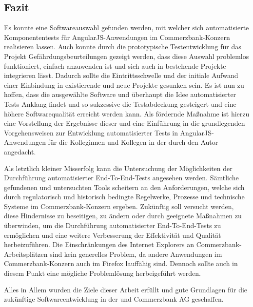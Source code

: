\subsection{Fazit}
Es konnte eine Softwareauswahl gefunden werden, mit welcher sich automatisierte Komponententests für AngularJS-Anwendungen im Commerzbank-Konzern realisieren lassen. Auch konnte durch die prototypische Testentwicklung für das Projekt Gefährdungsbeurteilungen gezeigt werden, dass diese Auswahl problemlos funktioniert, einfach anzuwenden ist und sich auch in bestehende Projekte integrieren lässt. Dadurch sollte die Eintrittsschwelle und der initiale Aufwand einer Einbindung in existierende und neue Projekte gesunken sein. Es ist nun zu hoffen, dass die ausgewählte Software und überhaupt die Idee automatisierter Tests Anklang findet und so sukzessive die Testabdeckung gesteigert und eine höhere Softwarequalität erreicht werden kann. Als fördernde Maßnahme ist hierzu eine Vorstellung der Ergebnisse dieser \titleDocument{} und eine Einführung in die grundlegenden Vorgehensweisen zur Entwicklung automatisierter Tests in AngularJS-Anwendungen für die Kolleginnen und Kollegen in der \domain{} durch den Autor angedacht.

Als letztlich kleiner Misserfolg kann die Untersuchung der Möglichkeiten der Durchführung automatisierter End-To-End-Tests angesehen werden. Sämtliche gefundenen und untersuchten Tools scheitern an den Anforderungen, welche sich durch regulatorisch und historisch bedingte Regelwerke, Prozesse und technische Systeme im Commerzbank-Konzern ergeben. Zukünftig soll versucht werden, diese Hindernisse zu beseitigen, zu ändern oder durch geeignete Maßnahmen zu überwinden, um die Durchführung automatisierter End-To-End-Tests zu ermöglichen und eine weitere Verbesserung der Effektivität und Qualität herbeizuführen. Die Einschränkungen des Internet Explorers an Commerzbank-Arbeitsplätzen sind kein generelles Problem, da andere Anwendungen im Commerzbank-Konzern auch im Firefox lauffähig sind. Dennoch sollte auch in diesem Punkt eine mögliche Problemlösung herbeigeführt werden.

Alles in Allem wurden die Ziele dieser Arbeit erfüllt und gute Grundlagen für die zukünftige Softwareentwicklung in der \domain{} und Commerzbank AG geschaffen.
